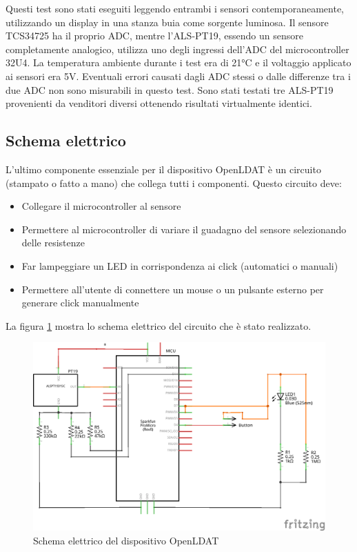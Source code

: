 Questi test sono stati eseguiti leggendo entrambi i sensori contemporaneamente, utilizzando un display in una stanza buia come sorgente luminosa. Il sensore TCS34725 ha il proprio ADC, mentre l'ALS-PT19, essendo un sensore completamente analogico, utilizza uno degli ingressi dell'ADC del microcontroller 32U4. La temperatura ambiente durante i test era di 21°C e il voltaggio applicato ai sensori era 5V. Eventuali errori causati dagli ADC stessi o dalle differenze tra i due ADC non sono misurabili in questo test. Sono stati testati tre ALS-PT19 provenienti da venditori diversi ottenendo risultati virtualmente identici.

\subsection{Schema elettrico}
L'ultimo componente essenziale per il dispositivo OpenLDAT è un circuito (stampato o fatto a mano) che collega tutti i componenti. Questo circuito deve:
\begin{itemize}
	\item Collegare il microcontroller al sensore
	\item Permettere al microcontroller di variare il guadagno del sensore selezionando delle resistenze
	\item Far lampeggiare un LED in corrispondenza ai click (automatici o manuali)
	\item Permettere all'utente di connettere un mouse o un pulsante esterno per generare click manualmente
\end{itemize}

La figura \ref{fig:circuit} mostra lo schema elettrico del circuito che è stato realizzato.
\begin{figure}[h]
	\centering
	\includegraphics[width=\textwidth]{Dispositivo_files/openldat_circuit.png}
	\caption{Schema elettrico del dispositivo OpenLDAT}
	\label{fig:circuit}
\end{figure}

